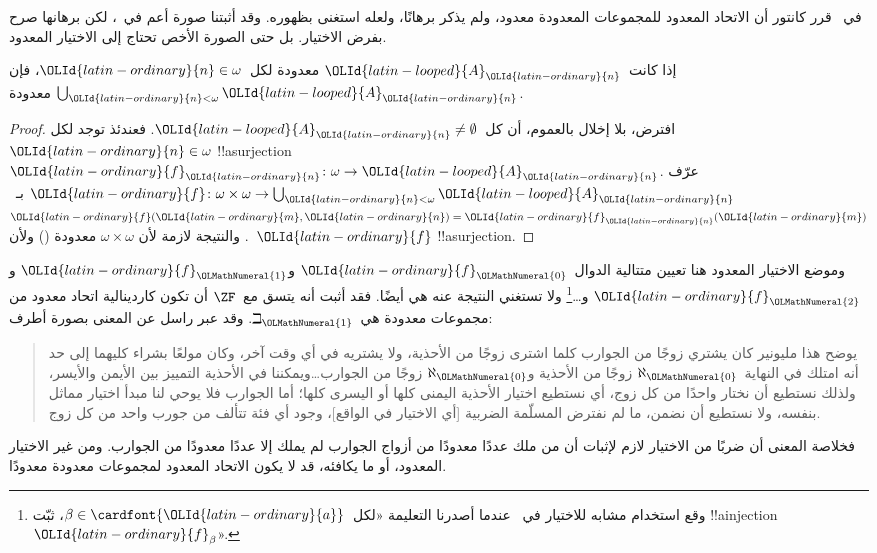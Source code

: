 \documentclass[../../../include/open-logic-section]{subfiles}
\begin{document}
\begin{ex}
في~\citeyear{Cantor1878} قرر كانتور أن الاتحاد المعدود للمجموعات
المعدودة معدود، ولم يذكر برهانًا، ولعله استغنى بظهوره. وقد أثبتنا صورة
أعم في~، لكن برهانها
صرح بفرض الاختيار. بل حتى الصورة الأخص تحتاج إلى الاختيار المعدود.

\begin{thm}
إذا كانت~$\OLId{latin-looped}{A}_\OLId{latin-ordinary}{n}$ معدودة لكل~$\OLId{latin-ordinary}{n} \in \omega$، فإن
$\bigcup_{\OLId{latin-ordinary}{n} < \omega} \OLId{latin-looped}{A}_\OLId{latin-ordinary}{n}$ معدودة.
\end{thm}

\begin{proof}
افترض، بلا إخلال بالعموم، أن كل~$\OLId{latin-looped}{A}_\OLId{latin-ordinary}{n} \neq \emptyset$. فعندئذ توجد
لكل~$\OLId{latin-ordinary}{n} \in \omega$ !!a{surjection}
$\OLId{latin-ordinary}{f}_\OLId{latin-ordinary}{n} \colon \omega \to \OLId{latin-looped}{A}_\OLId{latin-ordinary}{n}$. عرّف
$\OLId{latin-ordinary}{f} \colon \omega \times \omega \to \bigcup_{\OLId{latin-ordinary}{n} < \omega} \OLId{latin-looped}{A}_\OLId{latin-ordinary}{n}$
بـ~$\OLId{latin-ordinary}{f}(\OLId{latin-ordinary}{m}, \OLId{latin-ordinary}{n}) = \OLId{latin-ordinary}{f}_\OLId{latin-ordinary}{n}(\OLId{latin-ordinary}{m})$. والنتيجة لازمة لأن
$\omega \times \omega$ معدودة
() ولأن~$\OLId{latin-ordinary}{f}$
!!a{surjection}.
\end{proof}
\noindent
وموضع الاختيار المعدود هنا تعيين متتالية الدوال~$\OLId{latin-ordinary}{f}_\OLMathNumeral{0}$ و$\OLId{latin-ordinary}{f}_\OLMathNumeral{1}$ و$\OLId{latin-ordinary}{f}_\OLMathNumeral{2}$
و\dots\footnote{وقع استخدام مشابه
للاختيار في~ عندما
أصدرنا التعليمة «لكل~$\beta \in \cardfont{\OLId{latin-ordinary}{a}}$، ثبّت
!!a{injection}~$\OLId{latin-ordinary}{f}_\beta$».} ولا تستغني النتيجة عنه هي أيضًا. فقد أثبت
\citet{FefermanLevy1963} أنه يتسق مع~$\ZF$ أن تكون كاردينالية اتحاد
معدود من مجموعات معدودة هي~$\beth_\OLMathNumeral{1}$. وقد عبر راسل عن المعنى بصورة
أطرف:
\begin{quote}
  يوضح هذا مليونير كان يشتري زوجًا من الجوارب كلما اشترى زوجًا من
  الأحذية، ولا يشتريه في أي وقت آخر، وكان مولعًا بشراء كليهما إلى حد
  أنه امتلك في النهاية~$\aleph_\OLMathNumeral{0}$ زوجًا من الأحذية و$\aleph_\OLMathNumeral{0}$ زوجًا
  من الجوارب\dots\@ ويمكننا في الأحذية التمييز بين الأيمن والأيسر،
  ولذلك نستطيع أن نختار واحدًا من كل زوج، أي نستطيع اختيار الأحذية
  اليمنى كلها أو اليسرى كلها؛ أما الجوارب فلا يوحي لنا مبدأ اختيار
  مماثل بنفسه، ولا نستطيع أن نضمن، ما لم نفترض المسلّمة الضربية [أي
  الاختيار في الواقع]، وجود أي فئة تتألف من جورب واحد من كل زوج.
  \citep[p.~126]{Russell1919}
\end{quote}
فخلاصة المعنى أن ضربًا من الاختيار لازم لإثبات أن من ملك عددًا معدودًا
من أزواج الجوارب لم يملك إلا عددًا معدودًا من الجوارب. ومن غير
الاختيار المعدود، أو ما يكافئه، قد لا يكون الاتحاد المعدود لمجموعات
معدودة معدودًا.
\end{ex}
\end{document}
